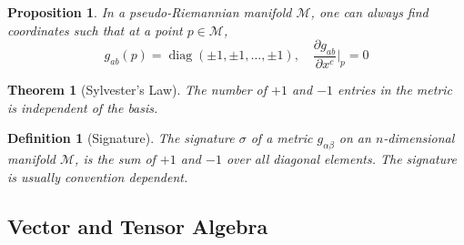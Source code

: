 \documentclass[a4paper]{article}
\DeclareMathOperator{\diag}{diag}
\theoremstyle{new}
\newtheorem{defi}{Definition}[section]
\newtheorem{thm}{Theorem}[section]
\newtheorem{prop}{Proposition}[section]
\begin{document}
\begin{prop}
In a pseudo-Riemannian manifold $\mathcal{M}$, one can always find coordinates such that at a point $p\in\mathcal{M}$,
$$g_{ab}(p)=\diag(\pm1,\pm1,\dots,\pm1),\quad\frac{\partial g_{ab}}{\partial x^c}\bigg|_p=0$$
\end{prop}
\begin{thm}[Sylvester's Law]
The number of $+1$ and $-1$ entries in the metric is independent of the basis.
\end{thm}
\begin{defi}[Signature]
The signature $\sigma$ of a metric $g_{\alpha\beta}$ on an $n$-dimensional manifold $\mathcal{M}$, is the sum of $+1$ and $-1$ over all diagonal elements. The signature is usually convention dependent.
\end{defi}
\newpage
\subsection{Vector and Tensor Algebra}
\end{document}
